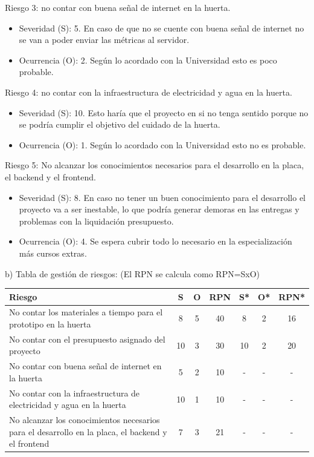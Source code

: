 \documentclass[
11pt, %
codirector, %
]{charter}
\begin{document}
Riesgo 3: no contar con buena señal de internet en la huerta.
\begin{itemize}
	\item Severidad (S): 5.
	En caso de que no se cuente con buena señal de internet no se van a poder enviar las métricas al servidor.
	\item Ocurrencia (O): 2.
	Según lo acordado con la Universidad esto es poco probable.
\end{itemize}

Riesgo 4: no contar con la infraestructura de electricidad y agua en la huerta.
\begin{itemize}
	\item Severidad (S): 10.
	Esto haría que el proyecto en si no tenga sentido porque no se podría cumplir el objetivo del cuidado de la huerta.
	\item Ocurrencia (O): 1.
	Según lo acordado con la Universidad esto no es probable.
\end{itemize}

Riesgo 5: No alcanzar los conocimientos necesarios para el desarrollo en la placa, el backend y el frontend.
\begin{itemize}
	\item Severidad (S): 8.
	En caso no tener un buen conocimiento para el desarrollo el proyecto va a ser inestable, lo que podría generar demoras en las entregas y problemas con la liquidación presupuesto.
	\item Ocurrencia (O): 4.
	Se espera cubrir todo lo necesario en la especialización más cursos extras.
\end{itemize}

b) Tabla de gestión de riesgos:      (El RPN se calcula como RPN=SxO)

\begin{table}[htpb]
\centering
\begin{tabularx}{\linewidth}{@{}|X|c|c|c|c|c|c|@{}}
\hline
\rowcolor[HTML]{C0C0C0} 
Riesgo & S & O & RPN & S* & O* & RPN* \\ \hline
      No contar los materiales a tiempo para el prototipo en la huerta &   8&   5&     40&    8&    2& 16     \\ \hline
      No contar con el presupuesto asignado del proyecto &   10&   3&     30&   10 &   2 & 20     \\ \hline
      No contar con buena señal de internet en la huerta &   5&   2&     10&   - &  -  & -     \\ \hline
      No contar con la infraestructura de electricidad y agua en la huerta &  10 &   1&     10&    -&  -  & -     \\ \hline
      No alcanzar los conocimientos necesarios para el desarrollo en la placa, el backend y el frontend &  7 &  3 & 21 &   - &   - &  -    \\ \hline
\end{tabularx}%
\end{table}
\end{document}
